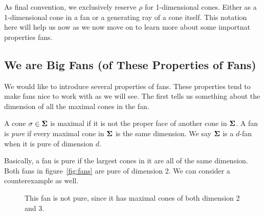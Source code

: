 \documentclass[12pt,oneside]{../../sfsuthesis}
\begin{document}
As final convention, we exclusively reserve \( \rho \) for 1-dimensional cones.
Either as a 1-dimensional cone in a fan or a generating ray of a cone itself.
This notation here will help us now as we now move on to learn more about some importnat properties fans.

\subsection{We are Big Fans (of These Properties of Fans)}

We would like to introduce several properties of fans.
These properties tend to make fans nice to work with as we will see.
The first tells us something about the dimension of all the maximal cones in the fan.
\begin{definition}[Pure]\th\label{def:pure}
    A cone \(\sigma \in {\bm{\Sigma}} \) is maximal if it is not the proper face of another cone in \( {\bm{\Sigma}} \).
    A fan is \emph{pure} if every maximal cone in \( {\bm{\Sigma}} \) is the same dimension.
    We say \( {\bm{\Sigma}} \) is a \( d \)-fan when it is pure of dimension \( d \).
\end{definition}
Basically, a fan is pure if the largest cones in it are all of the same dimension.
Both fans in figure~\ref{fig:fans} are pure of dimension 2.
We can consider a counterexample as well.
\begin{figure}[H]
    \centering
    \caption{This fan is not pure, since it has maximal cones of both dimension 2 and 3.}
\end{figure}
\end{document}

